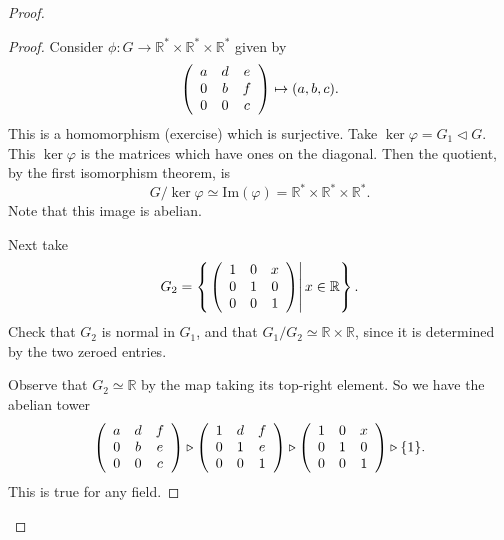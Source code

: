 \begin{proof}
\begin{xmpl}
\begin{enumerate}
{      \begin{proof}
        Consider $\phi : G
                     \to \mathbb{R}^* \times \mathbb{R}^* \times \mathbb{R}^*$
        given by
        $$
        \left(\begin{array}{c c c}
          a & d & e \\ 0 & b & f \\ 0 & 0 & c
        \end{array}\right) \mapsto (a,b,c).
        $$
        This is a homomorphism (exercise) which is
        surjective. Take $\ker \varphi = G_1 \triangleleft G$.
        This $\ker \varphi$ is the matrices which have ones on the
        diagonal. Then the quotient, by the first isomorphism theorem, is
        $$
        G / \ker \varphi
          \simeq \mathrm{Im}(\varphi)
          = \mathbb{R}^* \times \mathbb{R}^* \times \mathbb{R}^*.
        $$
        Note that this image is abelian.

        Next take
        $$
         G_2 =
          \left\{\left.
          \left(\begin{array}{c c c}
            1 & 0 & x \\ 0 & 1 & 0 \\ 0 & 0 & 1
          \end{array}\right)\right| x \in \mathbb{R}\right\}.
        $$
        Check that $G_2$ is normal in $G_1$, and that
        $G_1 / G_2 \simeq \mathbb{R} \times \mathbb{R}$, since it is
        determined by the two zeroed entries.

        Observe that $G_2 \simeq \mathbb{R}$ by the map taking its
        top-right element. So we have the abelian tower
        $$
        \left(\begin{array}{c c c}
          a & d & f \\ 0 & b & e \\ 0 & 0 & c
        \end{array}\right)
        \triangleright
        \left(\begin{array}{c c c}
          1 & d & f \\ 0 & 1 & e \\ 0 & 0 & 1
        \end{array}\right)
        \triangleright
        \left(\begin{array}{c c c}
          1 & 0 & x \\ 0 & 1 & 0 \\ 0 & 0 & 1
        \end{array}\right)
        \triangleright \{ 1 \}.
        $$
        This is true for any field.
      \end{proof}
    }
\end{enumerate}
\end{xmpl}


\end{proof}
